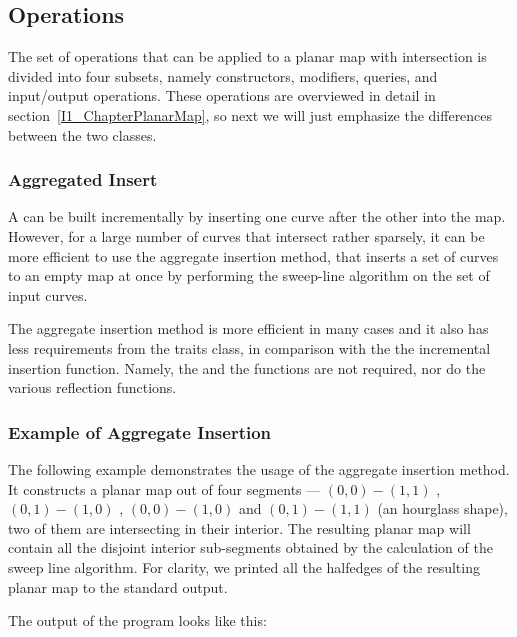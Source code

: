 \subsection{Operations}
The set of operations that can be applied to a planar map with intersection 
is divided into four subsets, namely constructors, modifiers, queries, and
input/output operations. These operations are overviewed in detail in
section~\ref{I1_ChapterPlanarMap}, so next we will just emphasize the 
differences between the two classes.

\subsubsection{Aggregated Insert}

A  can be built incrementally by
inserting one curve after the other into the map. However, for a large number
of curves that intersect rather sparsely, it can be more efficient to use the
aggregate insertion method, that inserts a set of curves to an empty map at
once by performing the sweep-line algorithm on the set of input curves.

The aggregate insertion method is more efficient in many cases and it also
has less requirements from the traits class, in comparison with the the
incremental insertion function. Namely, the  and the  functions are not required, nor do
the various reflection functions.

\subsubsection{Example of Aggregate Insertion}
\label{sssec:example1_aggrinsrt}
The following example demonstrates the usage of the aggregate insertion
method. It constructs a planar map out of four segments --- 
$(0,0)-(1,1)$ , $(0,1)-(1,0)$ , $(0,0)-(1,0)$ and $(0,1)-(1,1)$
(an hourglass shape), two of them are intersecting in their interior. 
The resulting planar map will contain all the disjoint interior sub-segments 
obtained by the calculation of the sweep line algorithm. For clarity, we printed all the halfedges of the resulting planar map to the standard output.


The output of the program looks like this:

